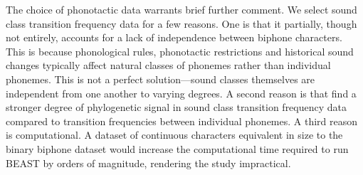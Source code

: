 The choice of phonotactic data warrants brief further comment. We select sound class transition frequency data for a few reasons. One is that it partially, though not entirely, accounts for a lack of independence between biphone characters. This is because phonological rules, phonotactic restrictions and historical sound changes typically affect natural classes of phonemes rather than individual phonemes. This is not a perfect solution---sound classes themselves are independent from one another to varying degrees. A second reason is that \textcite{macklin-cordes_phylogenetic_2020} find a stronger degree of phylogenetic signal in sound class transition frequency data compared to transition frequencies between individual phonemes. A third reason is computational. A dataset of continuous characters equivalent in size to the binary biphone dataset would increase the computational time required to run BEAST by orders of magnitude, rendering the study impractical.

